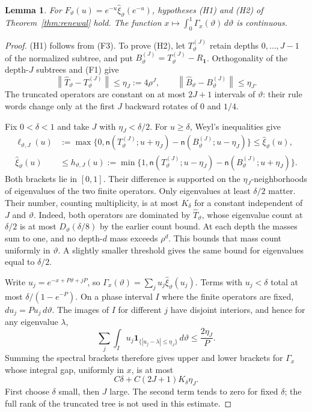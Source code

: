 \documentclass[11pt]{article}
\newtheorem{lemma}[theorem]{Lemma}
\theoremstyle{definition}
\theoremstyle{remark}
\newcommand{\one}{\mathbf 1}
\newcommand{\ncount}{\mathsf n}
\newcommand{\norm}[1]{\left\lVert #1\right\rVert}
\begin{document}
\begin{lemma}\label{lem:brackets}
For $F_\vartheta(u)=e^{-u}\widehat\xi_\vartheta(e^{-u})$, hypotheses
\textup{(H1)} and \textup{(H2)} of Theorem~\ref{thm:renewal} hold.
The function $x\mapsto\int_0^1\Gamma_x(\vartheta)\,d\vartheta$ is continuous.
\end{lemma}
\begin{proof}
(H1) follows from (F3). To prove (H2), let $T_\vartheta^{(J)}$ retain
depths $0,\ldots,J-1$ of the normalized subtree, and put
$B_\vartheta^{(J)}=T_\vartheta^{(J)}-R_\one$. Orthogonality of the
depth-$J$ subtrees and (F1) give
\[
 \norm{\widehat T_\vartheta-T_\vartheta^{(J)}}\le\eta_J:=4\rho^J,
 \qquad
 \norm{\widehat B_\vartheta-B_\vartheta^{(J)}}\le\eta_J.
\]
The truncated operators are constant on at most $2J+1$ intervals of
$\vartheta$: their rule words change only at the first $J$ backward
rotates of $0$ and $1/4$.

Fix $0<\delta<1$ and take $J$ with $\eta_J<\delta/2$. For $u\ge\delta$,
Weyl's inequalities give
\begin{align*}
 \ell_{\vartheta,J}(u)&:=\max\{0,
 \ncount(T_\vartheta^{(J)};u+\eta_J)
 -\ncount(B_\vartheta^{(J)};u-\eta_J)\}
 \le\widehat\xi_\vartheta(u),\\
 \widehat\xi_\vartheta(u)&\le
 h_{\vartheta,J}(u):=\min\{1,
 \ncount(T_\vartheta^{(J)};u-\eta_J)
 -\ncount(B_\vartheta^{(J)};u+\eta_J)\}.
\end{align*}
Both brackets lie in $[0,1]$. Their difference is supported on the
$\eta_J$-neighborhoods of eigenvalues of the two finite operators.
Only eigenvalues at least $\delta/2$ matter. Their number, counting
multiplicity, is at most $K_\delta$ for a constant independent of $J$
and $\vartheta$. Indeed, both operators are dominated by
$\widehat T_\vartheta$, whose eigenvalue count at $\delta/2$ is at most
$D_\vartheta(\delta/8)$ by the earlier count bound. At each depth the
masses sum to one, and no depth-$d$ mass exceeds $\rho^d$. This bounds that
mass count uniformly in $\vartheta$. A slightly smaller threshold gives
the same bound for eigenvalues equal to $\delta/2$.

Write $u_j=e^{-x+P\vartheta+jP}$, so
$\Gamma_x(\vartheta)=\sum_j u_j\widehat\xi_\vartheta(u_j)$.
Terms with $u_j<\delta$ total at most
$\delta/(1-e^{-P})$. On a phase interval $I$ where the finite operators
are fixed, $du_j=P u_j\,d\vartheta$. The images of $I$ for different
$j$ have disjoint interiors, and hence for any eigenvalue $\lambda$,
\[
 \sum_j\int_I u_j\one_{\{|u_j-\lambda|\le\eta_J\}}\,d\vartheta
 \le\frac{2\eta_J}{P}.
\]
Summing the spectral brackets therefore gives upper and lower brackets
for $\Gamma_x$ whose integral gap, uniformly in $x$, is at most
\begin{equation}\label{eq:bracket-gap}
 C\delta+C(2J+1)K_\delta\eta_J.
\end{equation}
First choose $\delta$ small, then $J$ large. The second term tends to
zero for fixed $\delta$; the full rank of the truncated tree is not
used in this estimate.


\end{proof}
\end{document}

